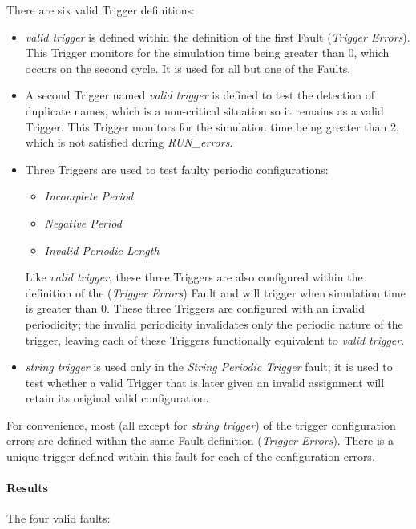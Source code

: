 \documentclass[11pt,fleqn]{report}
\begin{document}
There are six valid Trigger definitions:
\begin{itemize}
 \item \textit{valid trigger} is defined within the definition of the
       first Fault (\textit{Trigger Errors}). This Trigger monitors for
       the simulation time being greater than 0, which occurs on the
       second cycle. It is used for all but one of the Faults.
 \item A second Trigger named \textit{valid trigger} is defined to test
       the detection of duplicate names, which is a non-critical situation
       so it remains as a valid Trigger. This Trigger monitors for
       the simulation time being greater than 2, which is not satisfied
       during \textit{RUN\_errors}.
 \item Three Triggers are used to test faulty periodic configurations:
   \begin{itemize}
   \item \textit{Incomplete Period}
   \item \textit{Negative Period}
   \item \textit{Invalid Periodic Length}
   \end{itemize}
       Like \textit{valid trigger}, these three Triggers are also configured
       within the definition of the (\textit{Trigger Errors}) Fault and will
       trigger when simulation time is greater than 0.
       These three Triggers are configured with an invalid periodicity;
       the invalid periodicity invalidates only the periodic nature of the
       trigger, leaving each of these Triggers functionally equivalent to
       \textit{valid trigger}.
 \item \textit{string trigger} is used only in the
       \textit{String Periodic Trigger} fault; it is used to test whether a
       valid Trigger that is later given an invalid assignment will retain
       its original valid configuration.
\end{itemize}

For convenience, most (all except for \textit{string trigger}) of the
trigger configuration errors are defined within the same Fault definition
(\textit{Trigger Errors}).
There is a unique trigger defined within this fault for each of the
configuration errors.

\paragraph{Results}
The four valid faults:
\end{document}
